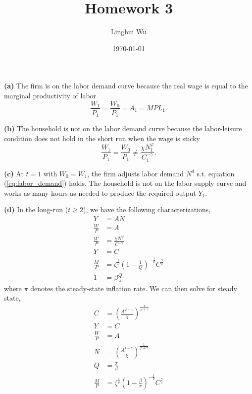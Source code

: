 \documentclass[12pt]{article}
\title{
Homework 3
}
\author{Linghui Wu}
\date{\today}
\begin{document}
\maketitle

\textbf{(a)} The firm is on the labor demand curve because the real wage is equal to the marginal productivity of labor 
\begin{equation}
\label{eq:labor_demand}
\frac{W_{1}}{P_{1}} = \frac{W_{0}}{P_{1}} = A_{1} = MPL_{1}.
\end{equation}

\textbf{(b)} The household is not on the labor demand curve because the labor-leisure condition does not hold in the short run when the wage is sticky
\begin{equation}
\label{eq:labor_supply}
\frac{W_{1}}{P_{1}} = \frac{W_{0}}{P_{1}} \neq \frac{\chi N^{\varphi}_{1}}{C^{-\gamma}_{1}}.
\end{equation}

\textbf{(c)} At $t=1$ with $W_{0}=W_{1}$, the firm adjusts labor demand $N^{d}$ s.t. equation (\ref{eq:labor_demand}) holds. 
The household is not on the labor supply curve and works as many hours as needed to produce the required output $Y_{1}$.

\textbf{(d)} In the long-run ($t \geq 2$), we have the following characterizations,
\begin{align*}
Y &= AN \\
\frac{W}{P} &= A \\
\frac{W}{P} &= \frac{\chi N^{\varphi}}{C^{-\gamma}} \\
Y &= C \\
\frac{M}{P} &= \zeta^{\frac{1}{\nu}}(1-\frac{1}{Q})^{-\frac{1}{\nu}}C^{\frac{\gamma}{\nu}} \\
1 &= \beta \frac{Q}{\pi}
\end{align*}
where $\pi$ denotes the steady-state inflation rate.
We can then solve for steady state,
\begin{align*}
C &= \left(\frac{A^{\varphi+1}}{\chi}\right)^{\frac{1}{\varphi+\gamma}} \\
Y &= C \\
\frac{W}{P} &= A \\
N &= \left(\frac{A^{1-\gamma}}{\chi}\right)^{\frac{1}{\varphi+\gamma}} \\
Q &= \frac{\pi}{\beta} \\
\frac{M}{P} &= \zeta^{\frac{1}{\nu}}(1-\frac{\beta}{\pi})^{-\frac{1}{\nu}}C^{\frac{\gamma}{\nu}}
\end{align*}
\end{document}
